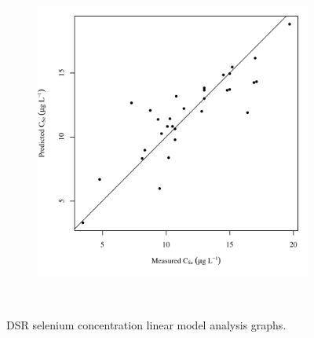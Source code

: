 \begin{landscape}
\begin{figure}
\begin{subfigure}{0.7\textwidth}
			\includegraphics[width=\tableCustomSize]{"Figures/Results_DSR/Stochastic/Conc Model pred v meas WIL"}
		\end{subfigure}\\
		\caption{DSR selenium concentration linear model analysis graphs.}
	\end{figure}
\end{landscape}

